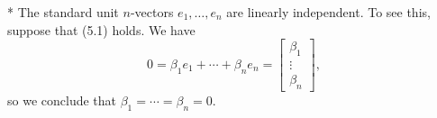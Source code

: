 * The standard unit \(n\)-vectors \(e_{1},\ldots,e_{n}\) are linearly independent. To see this, suppose that (5.1) holds. We have \[0=\beta_{1}e_{1}+\cdots+\beta_{n}e_{n}=\left[\begin{array}{c}\beta_{1}\\ \vdots\\ \beta_{n}\end{array}\right],\] so we conclude that \(\beta_{1}=\cdots=\beta_{n}=0\).

 